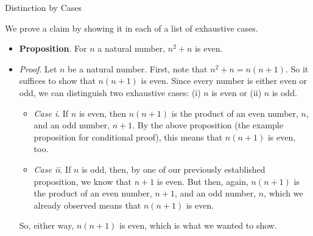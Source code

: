 \begin{frame}{Distinction by Cases}

We prove a claim by showing it in each of a list of exhaustive cases.

\begin{itemize}
	\item \textbf{Proposition}. For $n$ a natural number, $n^2+n$ is even. 
	
	\item  \emph{Proof}. Let $n$ be a natural number. First, note that $n^2+n=n(n+1)$. So it suffices to show that $n(n+1)$ is even. Since every number is either even or odd, we can distinguish two exhaustive cases: (i) $n$ is even or (ii) $n$ is odd. 
			
			\begin{itemize}
			
				\item \emph{Case i}. If $n$ is even, then $n(n+1)$ is the product of an even number, $n$, and an odd number, $n+1$. By the above proposition (the example proposition for conditional proof), this means that $n(n+1)$ is even, too.
				
				\item \emph{Case ii}. If $n$ is odd, then, by one of our previously established proposition, we know that $n+1$ is even. But then, again, $n(n+1)$ is the product of an even number, $n+1$, and an odd number, $n$, which we already observed means that $n(n+1)$ is even.
			
			\end{itemize}
			
			So, either way, $n(n+1)$ is even, which is what we wanted to show.
			
	\end{itemize}

\end{frame}

